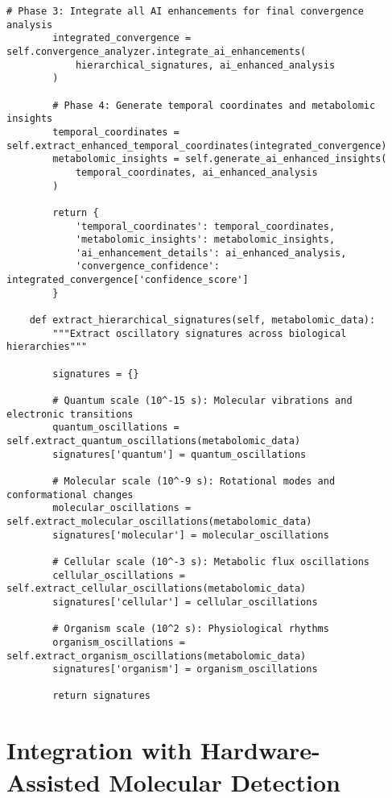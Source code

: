 \documentclass[12pt,a4paper]{article}
\begin{document}
\begin{lstlisting}[style=pythonstyle, caption=Guruza Convergence Integration with Lavoisier AI]
        # Phase 3: Integrate all AI enhancements for final convergence analysis
        integrated_convergence = self.convergence_analyzer.integrate_ai_enhancements(
            hierarchical_signatures, ai_enhanced_analysis
        )
        
        # Phase 4: Generate temporal coordinates and metabolomic insights
        temporal_coordinates = self.extract_enhanced_temporal_coordinates(integrated_convergence)
        metabolomic_insights = self.generate_ai_enhanced_insights(
            temporal_coordinates, ai_enhanced_analysis
        )
        
        return {
            'temporal_coordinates': temporal_coordinates,
            'metabolomic_insights': metabolomic_insights,
            'ai_enhancement_details': ai_enhanced_analysis,
            'convergence_confidence': integrated_convergence['confidence_score']
        }
    
    def extract_hierarchical_signatures(self, metabolomic_data):
        """Extract oscillatory signatures across biological hierarchies"""
        
        signatures = {}
        
        # Quantum scale (10^-15 s): Molecular vibrations and electronic transitions
        quantum_oscillations = self.extract_quantum_oscillations(metabolomic_data)
        signatures['quantum'] = quantum_oscillations
        
        # Molecular scale (10^-9 s): Rotational modes and conformational changes
        molecular_oscillations = self.extract_molecular_oscillations(metabolomic_data)
        signatures['molecular'] = molecular_oscillations
        
        # Cellular scale (10^-3 s): Metabolic flux oscillations
        cellular_oscillations = self.extract_cellular_oscillations(metabolomic_data)
        signatures['cellular'] = cellular_oscillations
        
        # Organism scale (10^2 s): Physiological rhythms
        organism_oscillations = self.extract_organism_oscillations(metabolomic_data)
        signatures['organism'] = organism_oscillations
        
        return signatures
\end{lstlisting}

\section{Integration with Hardware-Assisted Molecular Detection}
\end{document}
